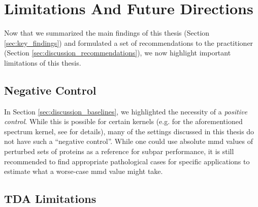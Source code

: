 \section{Limitations And Future Directions}\label{sec:discussion_limitations}

Now that we summarized the main findings of this thesis (Section
\ref{sec:key_findings}) and formulated a set of recommendations to the
practitioner (Section \ref{sec:discussion_recommendations}), we now highlight
important limitations of this thesis.


\subsection{Negative Control}

In Section \ref{sec:discussion_baselines}, we highlighted the necessity of a
\emph{positive control}. While this is possible for certain kernels (e.g. for
the aforementioned spectrum kernel, see \cite{kucera2022conditional} for
details), many of the settings discussed in this thesis do not have such a
``negative control''. While one could use absolute \acrshort{mmd} values of perturbed sets
of proteins as a reference for subpar performance, it is still recommended to find
appropriate pathological cases for specific applications to estimate what a worse-case
\acrshort{mmd} value might take.



\subsection{TDA Limitations}\label{sec:tda_limitations}

